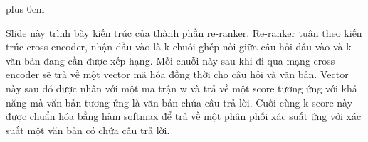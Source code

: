 \documentclass[11pt]{beamer}
\renewcommand{\raggedright}{\leftskip=0pt \rightskip=0pt plus 0cm}
\let\olditemize=\itemize
\renewenvironment{itemize}{\olditemize\raggedright}{\endlist}
\begin{document}
\begin{frame}
\begin{itemize}
	\item {\fontsize{8pt}{\baselineskip}\selectfont Slide này trình bày kiến trúc của thành phần re-ranker. Re-ranker tuân theo kiến trúc cross-encoder, nhận đầu vào là k chuỗi ghép nối giữa câu hỏi đầu vào và k văn bản đang cần được xếp hạng. Mỗi chuỗi này sau khi đi qua mạng cross-encoder sẽ trả về một vector mã hóa đồng thời cho câu hỏi và văn bản. Vector này sau đó được nhân với một ma trận w và trả về một score tương ứng với khả năng mà văn bản tương ứng là văn bản chứa câu trả lời. Cuối cùng k score này được chuẩn hóa bằng hàm softmax để trả về một phân phối xác suất ứng với xác suất một văn bản có chứa câu trả lời.}
\end{itemize}
\end{frame}
\end{document}
